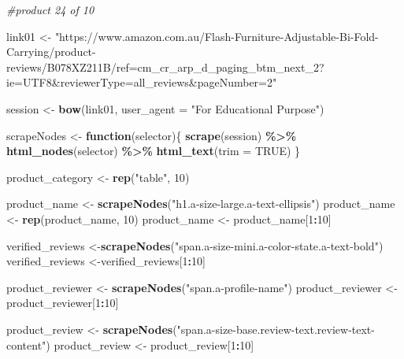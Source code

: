 \documentclass[
]{article}
\newenvironment{Shaded}{\begin{snugshade}}{\end{snugshade}}
\newcommand{\AttributeTok}[1]{\textcolor[rgb]{0.13,0.29,0.53}{#1}}
\newcommand{\CommentTok}[1]{\textcolor[rgb]{0.56,0.35,0.01}{\textit{#1}}}
\newcommand{\ConstantTok}[1]{\textcolor[rgb]{0.56,0.35,0.01}{#1}}
\newcommand{\ControlFlowTok}[1]{\textcolor[rgb]{0.13,0.29,0.53}{\textbf{#1}}}
\newcommand{\DecValTok}[1]{\textcolor[rgb]{0.00,0.00,0.81}{#1}}
\newcommand{\FunctionTok}[1]{\textcolor[rgb]{0.13,0.29,0.53}{\textbf{#1}}}
\newcommand{\NormalTok}[1]{#1}
\newcommand{\OtherTok}[1]{\textcolor[rgb]{0.56,0.35,0.01}{#1}}
\newcommand{\SpecialCharTok}[1]{\textcolor[rgb]{0.81,0.36,0.00}{\textbf{#1}}}
\newcommand{\StringTok}[1]{\textcolor[rgb]{0.31,0.60,0.02}{#1}}
\begin{document}
\begin{Shaded}
\begin{Highlighting}[]
\CommentTok{\#product 24 of 10}

\NormalTok{link01 }\OtherTok{\textless{}{-}} \StringTok{"https://www.amazon.com.au/Flash{-}Furniture{-}Adjustable{-}Bi{-}Fold{-}Carrying/product{-}reviews/B078XZ211B/ref=cm\_cr\_arp\_d\_paging\_btm\_next\_2?ie=UTF8\&reviewerType=all\_reviews\&pageNumber=2"}


\NormalTok{  session }\OtherTok{\textless{}{-}} \FunctionTok{bow}\NormalTok{(link01,}
               \AttributeTok{user\_agent =} \StringTok{"For Educational Purpose"}\NormalTok{)}

\NormalTok{  scrapeNodes }\OtherTok{\textless{}{-}} \ControlFlowTok{function}\NormalTok{(selector)\{}
    \FunctionTok{scrape}\NormalTok{(session) }\SpecialCharTok{\%\textgreater{}\%}
      \FunctionTok{html\_nodes}\NormalTok{(selector) }\SpecialCharTok{\%\textgreater{}\%}
      \FunctionTok{html\_text}\NormalTok{(}\AttributeTok{trim =} \ConstantTok{TRUE}\NormalTok{)}
\NormalTok{  \}}

\NormalTok{  product\_category }\OtherTok{\textless{}{-}} \FunctionTok{rep}\NormalTok{(}\StringTok{"table"}\NormalTok{, }\DecValTok{10}\NormalTok{)}

\NormalTok{  product\_name }\OtherTok{\textless{}{-}} \FunctionTok{scrapeNodes}\NormalTok{(}\StringTok{"h1.a{-}size{-}large.a{-}text{-}ellipsis"}\NormalTok{)}
\NormalTok{  product\_name }\OtherTok{\textless{}{-}} \FunctionTok{rep}\NormalTok{(product\_name, }\DecValTok{10}\NormalTok{)}
\NormalTok{  product\_name }\OtherTok{\textless{}{-}}\NormalTok{ product\_name[}\DecValTok{1}\SpecialCharTok{:}\DecValTok{10}\NormalTok{]}
  
\NormalTok{  verified\_reviews }\OtherTok{\textless{}{-}}\FunctionTok{scrapeNodes}\NormalTok{(}\StringTok{"span.a{-}size{-}mini.a{-}color{-}state.a{-}text{-}bold"}\NormalTok{)}
\NormalTok{  verified\_reviews }\OtherTok{\textless{}{-}}\NormalTok{verified\_reviews[}\DecValTok{1}\SpecialCharTok{:}\DecValTok{10}\NormalTok{]}
  
\NormalTok{  product\_reviewer }\OtherTok{\textless{}{-}} \FunctionTok{scrapeNodes}\NormalTok{(}\StringTok{"span.a{-}profile{-}name"}\NormalTok{)}
\NormalTok{  product\_reviewer }\OtherTok{\textless{}{-}}\NormalTok{ product\_reviewer[}\DecValTok{1}\SpecialCharTok{:}\DecValTok{10}\NormalTok{]}
  
\NormalTok{  product\_review }\OtherTok{\textless{}{-}} \FunctionTok{scrapeNodes}\NormalTok{(}\StringTok{"span.a{-}size{-}base.review{-}text.review{-}text{-}content"}\NormalTok{)}
\NormalTok{  product\_review }\OtherTok{\textless{}{-}}\NormalTok{ product\_review[}\DecValTok{1}\SpecialCharTok{:}\DecValTok{10}\NormalTok{]}
  

\end{Highlighting}
\end{Shaded}
\end{document}
